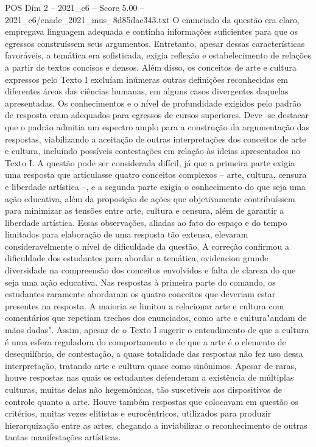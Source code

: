 \begin{textsample}{POS Dim 2 – 2021\_c6 – Score 5.00 – 2021\_c6/enade\_2021\_mus\_8d85dac343.txt}
O enunciado da questão era claro, empregava linguagem adequada e continha informações suficientes para que os egressos construíssem seus argumentos.
Entretanto, apesar dessas características favoráveis, a temática era sofisticada, exigia reflexão e estabelecimento de relações a partir de textos concisos e densos.
Além disso, os conceitos de arte e cultura expressos pelo Texto I excluíam inúmeras outras definições reconhecidas em diferentes áreas das ciências humanas, em alguns casos divergentes daquelas apresentadas.
Os conhecimentos e o nível de profundidade exigidos pelo padrão de resposta eram adequados para egressos de cursos superiores.
Deve -se destacar que o padrão admitia um espectro amplo para a construção da argumentação das respostas, viabilizando a aceitação de outras interpretações dos conceitos de arte e cultura, incluindo possíveis contestações em relação às ideias apresentados no Texto I.
A questão pode ser considerada difícil, já que a primeira parte exigia uma resposta que articulasse quatro conceitos complexos – arte, cultura, censura e liberdade artística –, e a segunda parte exigia o conhecimento do que seja uma ação educativa, além da proposição de ações que objetivamente contribuíssem para minimizar as tensões entre arte, cultura e censura, além de garantir a liberdade artística.
Essas observações, aliadas ao fato do espaço e do tempo limitados para elaboração de uma resposta tão extensa, elevaram consideravelmente o nível de dificuldade da questão.
A correção confirmou a dificuldade dos estudantes para abordar a temática, evidenciou grande diversidade na compreensão dos conceitos envolvidos e falta de clareza do que seja uma ação educativa.
Nas respostas à primeira parte do comando, os estudantes raramente abordaram os quatro conceitos que deveriam estar presentes na resposta.
A maioria se limitou a relacionar arte e cultura com comentários que repetiam trechos dos enunciados, como arte e cultura"andam de mãos dadas".
Assim, apesar de o Texto I sugerir o entendimento de que a cultura é uma esfera reguladora do comportamento e de que a arte é o elemento de desequilíbrio, de contestação, a quase totalidade das respostas não fez uso dessa interpretação, tratando arte e cultura quase como sinônimos.
Apesar de raras, houve respostas nas quais os estudantes defenderam a existência de múltiplas culturas, muitas delas não hegemônicas, tão suscetíveis aos dispositivos de controle quanto a arte.
Houve também respostas que colocavam em questão os critérios, muitas vezes elitistas e eurocêntricos, utilizados para produzir hierarquização entre as artes, chegando a inviabilizar o reconhecimento de outras tantas manifestações artísticas.

\end{textsample}
